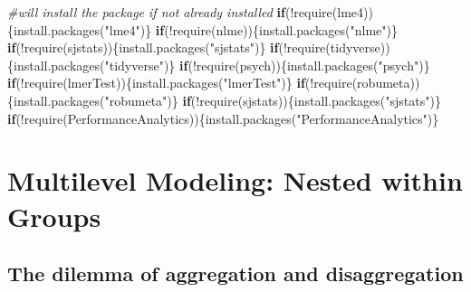\documentclass[
  english,
]{book}
\newenvironment{Shaded}{\begin{snugshade}}{\end{snugshade}}
\newcommand{\CommentTok}[1]{\textcolor[rgb]{0.56,0.35,0.01}{\textit{#1}}}
\newcommand{\ControlFlowTok}[1]{\textcolor[rgb]{0.13,0.29,0.53}{\textbf{#1}}}
\newcommand{\FunctionTok}[1]{\textcolor[rgb]{0.00,0.00,0.00}{#1}}
\newcommand{\NormalTok}[1]{#1}
\newcommand{\SpecialCharTok}[1]{\textcolor[rgb]{0.00,0.00,0.00}{#1}}
\newcommand{\StringTok}[1]{\textcolor[rgb]{0.31,0.60,0.02}{#1}}
\begin{document}
\begin{Shaded}
\begin{Highlighting}[]
\CommentTok{\#will install the package if not already installed}
\ControlFlowTok{if}\NormalTok{(}\SpecialCharTok{!}\FunctionTok{require}\NormalTok{(lme4))\{}\FunctionTok{install.packages}\NormalTok{(}\StringTok{"lme4"}\NormalTok{)\}}
\ControlFlowTok{if}\NormalTok{(}\SpecialCharTok{!}\FunctionTok{require}\NormalTok{(nlme))\{}\FunctionTok{install.packages}\NormalTok{(}\StringTok{"nlme"}\NormalTok{)\}}
\ControlFlowTok{if}\NormalTok{(}\SpecialCharTok{!}\FunctionTok{require}\NormalTok{(sjstats))\{}\FunctionTok{install.packages}\NormalTok{(}\StringTok{"sjstats"}\NormalTok{)\}}
\ControlFlowTok{if}\NormalTok{(}\SpecialCharTok{!}\FunctionTok{require}\NormalTok{(tidyverse))\{}\FunctionTok{install.packages}\NormalTok{(}\StringTok{"tidyverse"}\NormalTok{)\}}
\ControlFlowTok{if}\NormalTok{(}\SpecialCharTok{!}\FunctionTok{require}\NormalTok{(psych))\{}\FunctionTok{install.packages}\NormalTok{(}\StringTok{"psych"}\NormalTok{)\}}
\ControlFlowTok{if}\NormalTok{(}\SpecialCharTok{!}\FunctionTok{require}\NormalTok{(lmerTest))\{}\FunctionTok{install.packages}\NormalTok{(}\StringTok{"lmerTest"}\NormalTok{)\}}
\ControlFlowTok{if}\NormalTok{(}\SpecialCharTok{!}\FunctionTok{require}\NormalTok{(robumeta))\{}\FunctionTok{install.packages}\NormalTok{(}\StringTok{"robumeta"}\NormalTok{)\}}
\ControlFlowTok{if}\NormalTok{(}\SpecialCharTok{!}\FunctionTok{require}\NormalTok{(sjstats))\{}\FunctionTok{install.packages}\NormalTok{(}\StringTok{"sjstats"}\NormalTok{)\}}
\ControlFlowTok{if}\NormalTok{(}\SpecialCharTok{!}\FunctionTok{require}\NormalTok{(PerformanceAnalytics))\{}\FunctionTok{install.packages}\NormalTok{(}\StringTok{"PerformanceAnalytics"}\NormalTok{)\}}
\end{Highlighting}
\end{Shaded}

\hypertarget{multilevel-modeling-nested-within-groups}{%
\section{Multilevel Modeling: Nested within Groups}\label{multilevel-modeling-nested-within-groups}}

\hypertarget{the-dilemma-of-aggregation-and-disaggregation}{%
\subsection{The dilemma of aggregation and disaggregation}\label{the-dilemma-of-aggregation-and-disaggregation}}
\end{document}
